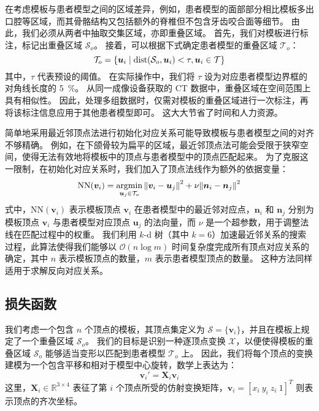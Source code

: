 在考虑模板与患者模型之间的区域差异，例如，患者模型的面部部分相比模板多出口腔等区域，而其骨骼结构又包括额外的脊椎但不包含牙齿咬合面等细节。
由此，我们必须从两者中抽取交集区域，亦即重叠区域。
首先，我们对模板进行标注，标记出重叠区域 $\mathcal{S}_o$。
接着，可以根据下式确定患者模型的重叠区域 $\mathcal{T}_o$：
\begin{equation}
  \mathcal{T}_o = \Bqty{\bm{u}_i \mid \dist(\mathcal{S}_o, \bm{u}_i) < \tau, \bm{u}_i \in \mathcal{T}}
\end{equation}
其中，$\tau$ 代表预设的阈值。
在实际操作中，我们将 $\tau$ 设为对应患者模型边界框的对角线长度的 \SI{5}{\percent}。
从同一成像设备获取的 CT 数据中，重叠区域在空间范围上具有相似性。
因此，处理多组数据时，仅需对模板的重叠区域进行一次标注，再将该标注信息应用于其他患者模型即可。
这大大节省了时间和人力资源。

简单地采用最近邻顶点法进行初始化对应关系可能导致模板与患者模型之间的对齐不够精确。
例如，在下颌骨较为扁平的区域，最近邻顶点法可能会受限于狭窄空间，使得无法有效地将模板中的顶点与患者模型中的顶点匹配起来。
为了克服这一限制，在初始化对应关系时，我们加入了顶点法线作为额外的依据变量：
\begin{equation}
  \mathrm{NN}(\bm{v}_i) = \operatorname*{argmin}_{\bm{u}_j \in \mathcal{T}_o} \norm{\bm{v}_i - \bm{u}_j}^2 + \nu \norm{\bm{n}_i - \bm{n}_j}^2
\end{equation}
式中，$\mathrm{NN}(\bm{v}_i)$ 表示模板顶点 $\bm{v}_i$ 在患者模型中的最近邻对应点，$\bm{n}_i$ 和 $\bm{n}_j$ 分别为模板顶点 $\bm{v}_i$ 与患者模型对应顶点 $\bm{u}_j$ 的法向量，而 $\nu$ 是一个超参数，用于调整法线在匹配过程中的权重。
我们利用 $k$-d 树（其中 $k = 6$）加速最近邻关系的搜索过程，此算法使得我们能够以 $\mathcal{O}(n \log{m})$ 时间复杂度完成所有顶点对应关系的确定，其中 $n$ 表示模板顶点的数量，$m$ 表示患者模型顶点的数量。
这种方法同样适用于求解反向对应关系。

\subsection{损失函数}

我们考虑一个包含 $n$ 个顶点的模板，其顶点集定义为 $\mathcal{S} = \{\bm{v}_i\}$，并且在模板上规定了一个重叠区域 $\mathcal{S}_o$。
我们的目标是识别一种逐顶点变换 $\mathcal{X}$，以便使得模板的重叠区域 $\mathcal{S}_o$ 能够适当变形以匹配到患者模型 $\mathcal{T}_o$ 上。
因此，我们将每个顶点的变换建模为一个包含平移和相对于模型中心旋转，数学上表达为：
\begin{equation}
  \bm{v}_i' = \bm{X}_i \bm{v}_i
\end{equation}
这里，$\bm{X}_i \in \mathbb{R}^{3 \times 4}$ 表征了第 $i$ 个顶点所受的仿射变换矩阵，$\bm{v}_i = [x_i ~ y_i ~ z_i ~ 1]^T$ 则表示顶点的齐次坐标。

